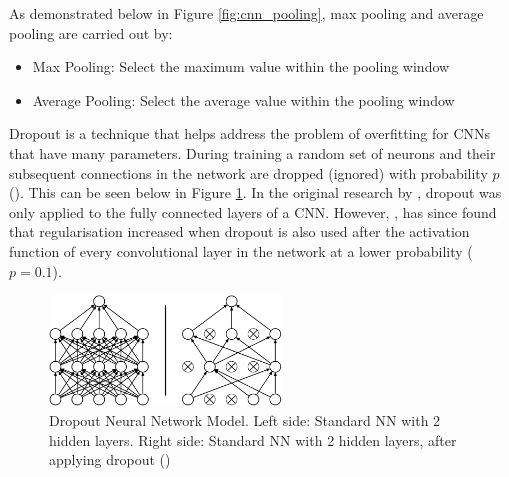 As demonstrated below in Figure \ref{fig:cnn_pooling}, max pooling and average pooling are carried out by:

\begin{itemize}
    \item Max Pooling: Select the maximum value within the pooling window
    \item Average Pooling: Select the average value within the pooling window
\end{itemize}

Dropout is a technique that helps address the problem of overfitting for \acrshort{CNN}s that have many parameters. During training a random set of neurons and their subsequent connections in the network are dropped (ignored) with probability $p$ (\cite{srivastava_dropout_2014}). This can be seen below in Figure \ref{fig:cnn_dropout}. In the original research by \cite{hinton_dropout_2012}, dropout was only applied to the fully connected layers of a \acrshort{CNN}. However, \cite{lai_dropout_2017}, has since found that regularisation increased when dropout is also used after the activation function of every convolutional layer in the network at a lower probability ($p = 0.1$).

\begin{figure}[ht!]
\centering
\includegraphics[width=0.55\textwidth]{media/literature/machine_learning/ml_dropout3.png}
\caption[Diagram of the Dropout Neural Network Model]{Dropout Neural Network Model. Left side: Standard \acrshort{NN} with 2 hidden layers. Right side: Standard \acrshort{NN} with 2 hidden layers, after applying dropout (\cite{srivastava_dropout_2014})}
\label{fig:cnn_dropout}
\end{figure}




%    


